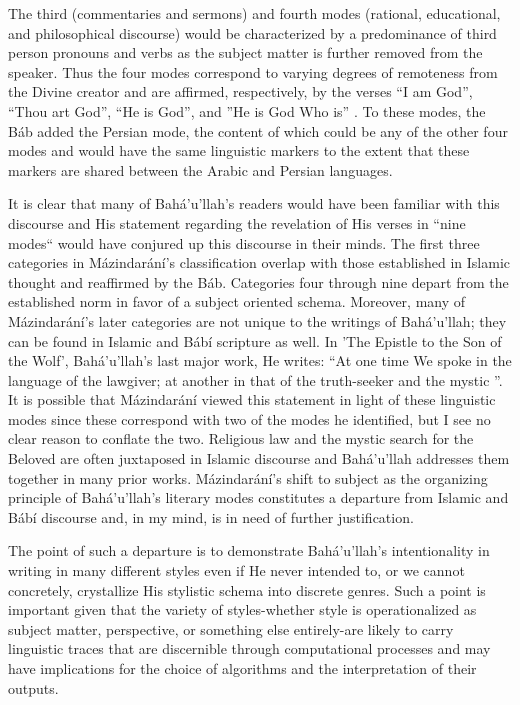 \documentclass[12pt, oneside]{report}
\begin{document}
The third (commentaries and sermons) and fourth modes (rational, educational, and philosophical discourse) would be characterized by a predominance of third person pronouns and verbs as the subject matter is further removed from the speaker.
Thus the four modes correspond to varying degrees of remoteness from the Divine creator and are affirmed, respectively, by the verses ``I am God'', ``Thou art God'', ``He is God'', and ''He is God Who is'' \cite{saiedi_gate_2008}.
To these modes, the B\'{a}b added the Persian mode, the content of which could be any of the other four modes \cite{saiedi_gate_2008} and would have the same linguistic markers to the extent that these markers are shared between the Arabic and Persian languages.
\par
It is clear that many of Bah\'{a}'u'llah's readers would have been familiar with this discourse and His statement regarding the revelation of His verses in ``nine modes`` would have conjured up this discourse in their minds.
The first three categories in M\'{a}zindar\'{a}n\'{i}'s classification overlap with those established in Islamic thought and reaffirmed by the B\'{a}b.
Categories four through nine depart from the established norm in favor of a subject oriented schema.
Moreover, many of M\'{a}zindar\'{a}n\'{i}'s later categories are not unique to the writings of Bah\'{a}'u'llah; they can be found in Islamic and B\'{a}b\'{i} scripture as well.
In 'The Epistle to the Son of the Wolf', Bah\'{a}'u'llah's last major work, He writes: “At one time We spoke in the language of the lawgiver; at another in that of the truth-seeker and the mystic \cite{}”.
It is possible that M\'{a}zindar\'{a}n\'{i} viewed this statement in light of these linguistic modes since these correspond with two of the modes he identified, but I see no clear reason to conflate the two.
Religious law and the mystic search for the Beloved are often juxtaposed in Islamic discourse and Bah\'{a}'u'llah addresses them together in many prior works.
M\'{a}zindar\'{a}n\'{i}'s shift to subject as the organizing principle of Bah\'{a}'u'llah's literary modes constitutes a departure from Islamic and B\'{a}b\'{i} discourse and, in my mind, is in need of further justification.
\par
The point of such a departure is to demonstrate Bah\'{a}'u'llah's intentionality in writing in many different styles even if He never intended to, or we cannot concretely, crystallize His stylistic schema into discrete genres.
Such a point is important given that the variety of styles-whether style is operationalized as subject matter, perspective, or something else entirely-are likely to carry linguistic traces that are discernible through computational processes and may have implications for the choice of algorithms and the interpretation of their outputs.
\end{document}
